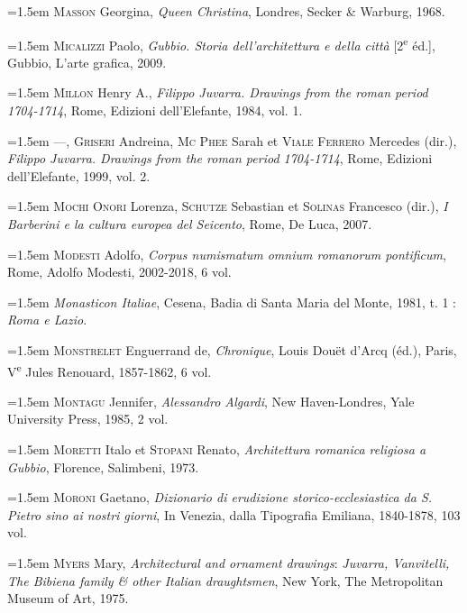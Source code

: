 \documentclass[12pt,twoside,openany]{book}
\newenvironment{PurhBibliography}
  {%
    \par
    \setlength{\parindent}{0pt}%
    \setlength{\leftskip}{0pt}%
  }
  {%
    \par
  }
\begin{document}
\begin{PurhBibliography}
\noindent\hangindent=1.5em \textsc{Masson} Georgina, \textit{Queen Christina}, Londres, Secker \& Warburg, 1968.\par
\noindent\hangindent=1.5em \textsc{Micalizzi} Paolo, \textit{Gubbio. Storia dell’architettura e della città} [2\textsuperscript{e} éd.], Gubbio, L’arte grafica, 2009.\par
\noindent\hangindent=1.5em \textsc{Millon} Henry A., \textit{Filippo Juvarra. Drawings from the roman period 1704-1714}, Rome, Edizioni dell’Elefante, 1984, vol. 1.\par
\noindent\hangindent=1.5em —, \textsc{Griseri} Andreina, \textsc{Mc Phee} Sarah et \textsc{Viale Ferrero} Mercedes (dir.), \textit{Filippo Juvarra. Drawings from the roman period 1704-1714}, Rome, Edizioni dell’Elefante, 1999, vol. 2.\par
\noindent\hangindent=1.5em \textsc{Mochi Onori} Lorenza, \textsc{Schutze} Sebastian et \textsc{Solinas} Francesco (dir.), \textit{I Barberini e la cultura europea del Seicento}, Rome, De Luca, 2007.\par
\noindent\hangindent=1.5em \textsc{Modesti} Adolfo, \textit{Corpus numismatum omnium romanorum pontificum}, Rome, Adolfo Modesti, 2002-2018, 6 vol.\par
\noindent\hangindent=1.5em \textit{Monasticon Italiae}, Cesena, Badia di Santa Maria del Monte, 1981, t. 1 : \textit{Roma e Lazio}.\par
\noindent\hangindent=1.5em \textsc{Monstrelet} Enguerrand de, \textit{Chronique}, Louis Douët d’Arcq (éd.), Paris, V\textsuperscript{e} Jules Renouard, 1857-1862, 6 vol.\par
\noindent\hangindent=1.5em \textsc{Montagu} Jennifer, \textit{Alessandro Algardi}, New Haven-Londres, Yale University Press, 1985, 2 vol.\par
\noindent\hangindent=1.5em \textsc{Moretti} Italo et \textsc{Stopani} Renato, \textit{Architettura romanica religiosa a Gubbio}, Florence, Salimbeni, 1973.\par
\noindent\hangindent=1.5em \textsc{Moroni} Gaetano, \textit{Dizionario di erudizione storico-ecclesiastica da S. Pietro sino ai nostri giorni}, In Venezia, dalla Tipografia Emiliana, 1840-1878, 103 vol.\par
\noindent\hangindent=1.5em \textsc{Myers} Mary, \textit{Architectural and ornament drawings}: \textit{Juvarra, Vanvitelli, The Bibiena family \& other Italian draughtsmen}, New York, The Metropolitan Museum of Art, 1975.\par

\end{PurhBibliography}
\end{document}
